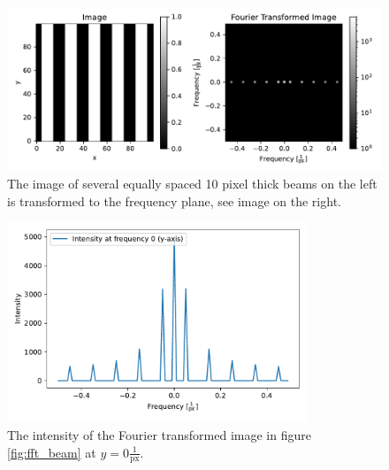 \begin{figure}[H]
	\centering
		\includegraphics[width=1.0\textwidth]{pics/fft_simulationmorebeams.pdf}
		\caption{The image of several equally spaced 10 pixel thick beams on the left is transformed to the frequency plane, see image on the right.}
		\label{fig:fft_beams}
\end{figure}
\begin{figure}[H]
	\centering
		\includegraphics[width=0.8\textwidth]{pics/fft_simulation_cutmorebeams.pdf}
		\caption{The intensity of the Fourier transformed image in figure \ref{fig:fft_beam} at $y=0 \frac{1}{\mathrm{px}}$.}
		\label{fig:fft_beams_cut}
\end{figure}

